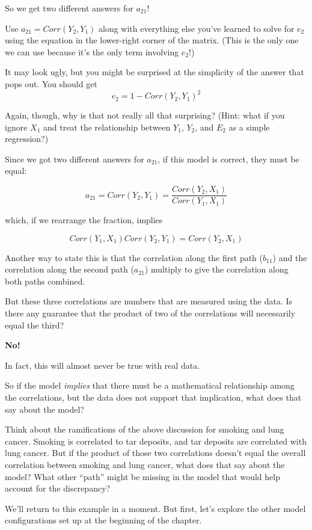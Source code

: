 \documentclass[
]{book}
\begin{document}
So we get two different answers for \(a_{21}\)!

Use \(a_{21} = Corr(Y_{2}, Y_{1})\) along with everything else you've learned to solve for \(e_{2}\) using the equation in the lower-right corner of the matrix. (This is the only one we can use because it's the only term involving \(e_{2}\)!)

It may look ugly, but you might be surprised at the simplicity of the answer that pops out. You should get
\[
e_{2} = 1 - Corr(Y_{2}, Y_{1})^{2}
\]

Again, though, why is that not really all that surprising? (Hint: what if you ignore \(X_{1}\) and treat the relationship between \(Y_{1}\), \(Y_{2}\), and \(E_{2}\) as a simple regression?)

Since we got two different answers for \(a_{21}\), if this model is correct, they must be equal:

\[
a_{21} = Corr(Y_{2}, Y_{1}) = \frac{Corr(Y_{2}, X_{1})}{Corr(Y_{1}, X_{1})}
\]

which, if we rearrange the fraction, implies

\[
Corr(Y_{1}, X_{1}) Corr(Y_{2}, Y_{1}) = Corr(Y_{2}, X_{1}) 
\]

Another way to state this is that the correlation along the first path (\(b_{11}\)) and the correlation along the second path (\(a_{21}\)) multiply to give the correlation along both paths combined.

But these three correlations are numbers that are measured using the data. Is there any guarantee that the product of two of the correlations will necessarily equal the third?

\textbf{No!}

In fact, this will almost never be true with real data.

So if the model \emph{implies} that there must be a mathematical relationship among the correlations, but the data does not support that implication, what does that say about the model?

Think about the ramifications of the above discussion for smoking and lung cancer. Smoking is correlated to tar deposits, and tar deposits are correlated with lung cancer. But if the product of those two correlations doesn't equal the overall correlation between smoking and lung cancer, what does that say about the model? What other ``path'' might be missing in the model that would help account for the discrepancy?

We'll return to this example in a moment. But first, let's explore the other model configurations set up at the beginning of the chapter.
\end{document}

